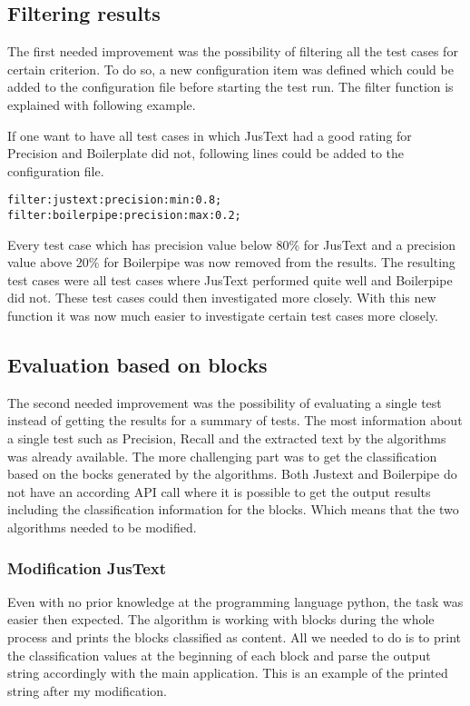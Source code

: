 \subsection{Filtering results}
The first needed improvement was the possibility of filtering all the test cases for certain criterion. To do so, a new configuration item was defined which could be added to the configuration file before starting the test run. The filter function is explained with following example.

If one want to have all test cases in which JusText had a good rating for Precision and Boilerplate did not, following lines could be added to the configuration file.

\begin{lstlisting}
filter:justext:precision:min:0.8;
filter:boilerpipe:precision:max:0.2;
\end{lstlisting} 

Every test case which has precision value below 80\% for JusText and a precision value above 20\% for Boilerpipe was now removed from the results. The resulting test cases were all test cases where JusText performed quite well and Boilerpipe did not. These test cases could then investigated more closely.
With this new function it was now much easier to investigate certain test cases more closely.

\subsection{Evaluation based on blocks}

The second needed improvement was the possibility of evaluating a single test instead of getting the results for a summary of tests.
The most information about a single test such as Precision, Recall and the extracted text by the algorithms was already available. The more challenging part was to get the classification based on the bocks generated by the algorithms. Both Justext and Boilerpipe do not have an according API call where it is possible to get the output results including the classification information for the blocks. Which means that the two algorithms needed to be modified.

\subsubsection{Modification JusText}
\label{subsec:Modification JusText}

Even with no prior knowledge at the programming language python, the task was easier then expected. The algorithm is working with blocks during the whole process and prints the blocks classified as content. All we needed to do is to print the classification values at the beginning of each block and parse the output string accordingly with the main application.
This is an example of the printed string after my modification. \linebreak

